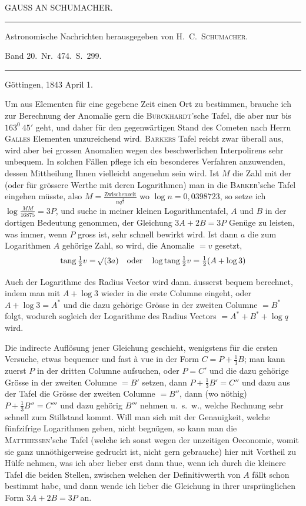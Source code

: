 \clearpage{}%
\begin{center}
{\small GAUSS AN SCHUMACHER.\par}
\medskip\hrule\medskip
{\small Astronomische Nachrichten herausgegeben von H.\ C.\ \textsc{Schumacher}.\par
Band 20.\ Nr.\ 474.\ S.\ 299.\par}
\medskip\hrule
\end{center}\medskip
\begin{flushright}Göttingen, 1843 April 1.\end{flushright}
Um aus Elementen für eine gegebene Zeit einen Ort zu bestimmen, brauche ich zur Berechnung der Anomalie gern die \textsc{Burckhardt}'sche Tafel, die aber nur bis $163^0\ 45'$ geht, und daher für den gegenwärtigen Stand des Cometen nach Herrn \textsc{Galles} Elementen unzureichend wird. \textsc{Barkers} Tafel reicht zwar überall aus, wird aber bei grossen Anomalien wegen des beschwerlichen Interpolirens sehr unbequem. In solchen Fällen pflege ich ein besonderes Verfahren anzuwenden, dessen Mittheilung Ihnen vielleicht angenehm sein wird. Ist $M$ die Zahl mit der (oder für grössere Werthe mit deren Logarithmen) man in die \textsc{Barker}'sche Tafel eingehen müsste, also $M=\frac{\text{Zwischenzeit}}{nq^{\frac32}}$ wo $\log n=0{,}0398723$, so setze ich $\log\frac{MM}{16875}=3P$, und suche in meiner kleinen Logarithmentafel, $A$ und $B$ in der dortigen Bedeutung genommen, der Gleichung $3A+2B=3P$ Genüge zu leisten, was immer, wenn $P$ gross ist, sehr schnell bewirkt wird. Ist dann $a$ die zum Logarithmen $A$ gehörige Zahl, so wird, die Anomalie $=v$ gesetzt,
\[
\operatorname{tang}\tfrac12v=\mathord{{}^{}\!\surd}(3a)\quad\text{oder}\quad
\log\operatorname{tang}\tfrac12v=\tfrac12(A+\log3)
\]

Auch der Logarithme des Radius Vector wird dann. äusserst bequem berechnet, indem man mit $A+\log3$ wieder in die erste Columne eingeht, oder $A+\log3=A^*$ und die dazu gehörige Grösse in der zweiten Columne $=B^*$ folgt, wodurch sogleich der Logarithme des Radius Vectors $=A^*+B^*+\log q$ wird.

%
Die indirecte Auflösung jener Gleichung geschieht, wenigstens für die ersten Versuche, etwas bequemer und fast à vue in der Form $C=P+\frac13B$; man kann zuerst $P$ in der dritten Columne aufsuchen, oder $P=C'$ und die dazu gehörige Grösse in der zweiten Columne $=B'$ setzen, dann $P+\frac13B'=C''$ und dazu aus der Tafel die Grösse der zweiten Columne $=B''$, dann (wo nöthig) $P+\frac13B''=C'''$ und dazu gehörig $B'''$ nehmen u.\ s.\ w., welche Rechnung sehr schnell zum Stillstand kommt. Will man sich mit der Genauigkeit, welche fünfzifrige Logarithmen geben, nicht begnügen, so kann man die \textsc{Matthiessen}'sche Tafel (welche ich sonst wegen der unzeitigen Oeconomie, womit sie ganz unnöthigerweise gedruckt ist, nicht gern gebrauche) hier mit Vortheil zu Hülfe nehmen, was ich aber lieber erst dann thue, wenn ich durch die kleinere Tafel die beiden Stellen, zwischen welchen der Definitivwerth von $A$ fällt schon bestimmt habe, und dann wende ich lieber die Gleichung in ihrer ursprünglichen Form $3A+2B=3P$ an.

